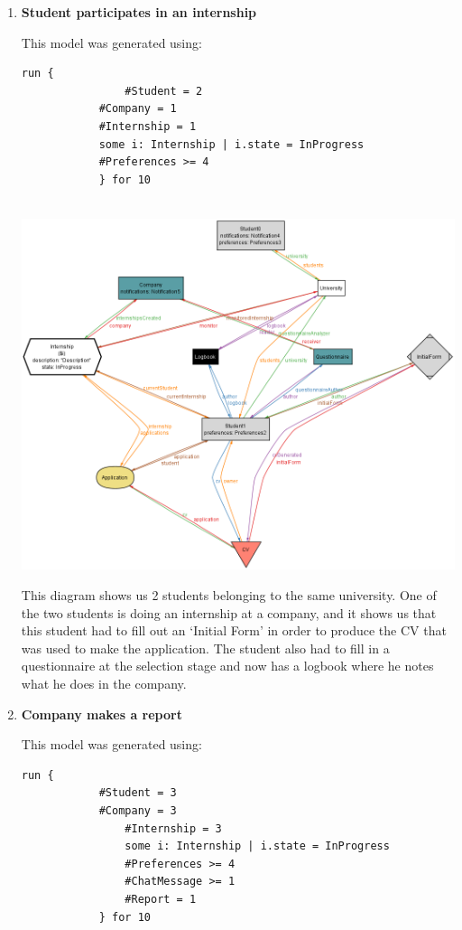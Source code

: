 \begin{enumerate}[label=,leftmargin=0cm]
      \item \textbf{Student participates in an internship}

            This model was generated using:
            \begin{lstlisting}[language=alloy]
            run {
                #Student = 2
	        #Company = 1
	        #Internship = 1
	        some i: Internship | i.state = InProgress
	        #Preferences >= 4
            } for 10
	
          \end{lstlisting}

            \begin{adjustbox}{max size={\textwidth}{\textheight}}
                  \includegraphics{alloy/alloy1.png}
            \end{adjustbox}

            This diagram shows us 2 students belonging to the same university. One of the two students is doing an internship at a company, and it shows us that this student had to fill out an ‘Initial Form’ in order to produce the CV that was used to make the application. The student also had to fill in a questionnaire at the selection stage and now has a logbook where he notes what he does in the company.

        \pagebreak
        \item \textbf{Company makes a report}

            This model was generated using:
            \begin{lstlisting}[language=alloy]
            run {
	        #Student = 3
	        #Company = 3
                #Internship = 3
                some i: Internship | i.state = InProgress
                #Preferences >= 4
                #ChatMessage >= 1
                #Report = 1
            } for 10
	

\end{lstlisting}
\end{enumerate}
